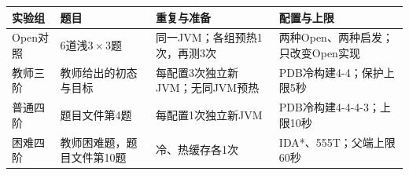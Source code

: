 \begin{tabular}{p{49bp}p{112bp}p{88bp}p{124bp}}
\hline
\textbf{实验组} & \textbf{题目} & \textbf{重复与准备} & \textbf{配置与上限} \\
\hline
Open对照 & 6道浅$3\times3$题 & 同一JVM；各组预热1次，再测3次 & 两种Open、两种启发；只改变Open实现 \\
教师三阶 & 教师给出的初态与目标 & 每配置3次独立新JVM；无同JVM预热 & PDB冷构建4-4；保护上限5秒 \\
普通四阶 & 题目文件第4题 & 每配置1次独立新JVM & PDB冷构建4-4-4-3；上限10秒 \\
困难四阶 & 教师困难题，题目文件第10题 & 冷、热缓存各1次 & IDA*、555T；父端上限60秒 \\
\hline
\end{tabular}

